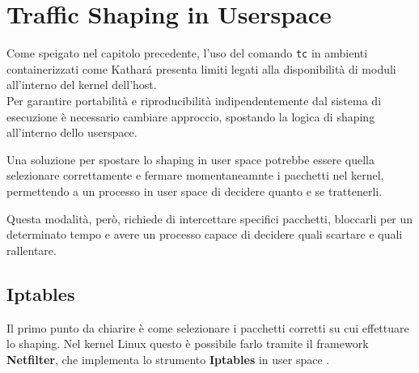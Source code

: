 \chapter{Traffic Shaping in Userspace}
\label{cap:userspace}
Come speigato nel capitolo precedente, l'uso del comando \texttt{tc} in ambienti containerizzati come Kathará 
presenta limiti legati alla disponibilità di moduli all'interno del kernel dell'host. \\ 
Per garantire portabilità e riproducibilità indipendentemente dal sistema di esecuzione è necessario cambiare approccio, 
spostando la logica di shaping all'interno dello userspace.

\begin{intuition}
  Una soluzione per spostare lo shaping in user space potrebbe essere quella selezionare correttamente e fermare momentaneamnte i pacchetti nel kernel,
  permettendo a un processo in user space di decidere quanto e se trattenerli.
\end{intuition}
Questa modalità, però, richiede di intercettare specifici pacchetti,
bloccarli per un determinato tempo e avere un processo capace di decidere quali scartare e quali rallentare.

\section{Iptables}
Il primo punto da chiarire è come selezionare i pacchetti corretti su cui effettuare lo shaping.
Nel kernel Linux questo è possibile farlo tramite il framework \textbf{Netfilter}, che implementa lo strumento \textbf{Iptables} in user space \cite{netfilter}.

